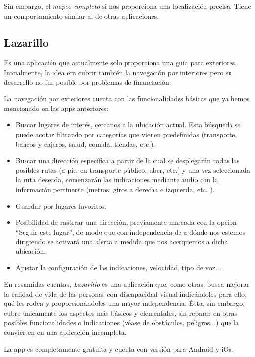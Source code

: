 \documentclass{article}
\begin{document}
	    Sin embargo, el \textit{mapeo completo} sí nos proporciona una localización precisa. Tiene un comportamiento similar al de otras aplicaciones.

	\subsection{Lazarillo}
	    Es una aplicación que actualmente solo proporciona una guía para exteriores. Inicialmente, la idea era cubrir también la navegación por interiores pero su desarrollo no fue posible por problemas de financiación.
	
	    La navegación por exteriores cuenta con las funcionalidades básicas que ya hemos mencionado en las apps anteriores: \begin{itemize}
	        \item Buscar lugares de interés, cercanos a la ubicación actual. Esta búsqueda se puede acotar filtrando por categorías que vienen predefinidas (transporte, bancos y cajeros, salud, comida, tiendas, etc.).
	        \item Buscar una dirección específica a partir de la cual se desplegarán todas las posibles rutas (a pie, en transporte público, uber, etc.) y una vez seleccionada la ruta deseada, comenzarán las indicaciones mediante audio con la información pertinente (metros, giros a derecha e izquierda, etc. ). 
	        \item Guardar por lugares favoritos.
	        \item Posibilidad de rastrear una dirección, previamente marcada con la opcion ``Seguir este lugar'', de modo que con independencia de a dónde nos estemos dirigiendo se activará una alerta a medida que nos acerquemos a dicha ubicación.
	        \item Ajustar la configuración de las indicaciones, velocidad, tipo de voz...
	    \end{itemize}
	
	    En resumidas cuentas, \textit{Lazarillo} es una aplicación que, como otras, busca mejorar la calidad de vida de las personas con discapacidad visual indicándoles para ello, qué les rodea y proporcionándoles una mayor independencia. Ésta, sin embargo, cubre únicamente los aspectos más básicos y elementales, sin reparar en otras posibles funcionalidades o indicaciones (véase de obstáculos, peligros...) que la convierten en una aplicación incompleta.
	
    	La app es completamente gratuita y cuenta con versión para Android y iOs.
\end{document}
